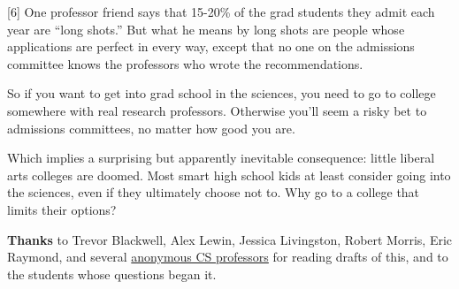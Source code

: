 {[}6{]} One professor friend says that 15-20\% of the grad students they
admit each year are ``long shots.'' But what he means by long shots are
people whose applications are perfect in every way, except that no one
on the admissions committee knows the professors who wrote the
recommendations.

So if you want to get into grad school in the sciences, you need to go
to college somewhere with real research professors. Otherwise you'll
seem a risky bet to admissions committees, no matter how good you are.

Which implies a surprising but apparently inevitable consequence: little
liberal arts colleges are doomed. Most smart high school kids at least
consider going into the sciences, even if they ultimately choose not to.
Why go to a college that limits their options?

\textbf{Thanks} to Trevor Blackwell, Alex Lewin, Jessica Livingston,
Robert Morris, Eric Raymond, and several
\href{undergrad2.html}{anonymous CS professors} for reading drafts of
this, and to the students whose questions began it.
